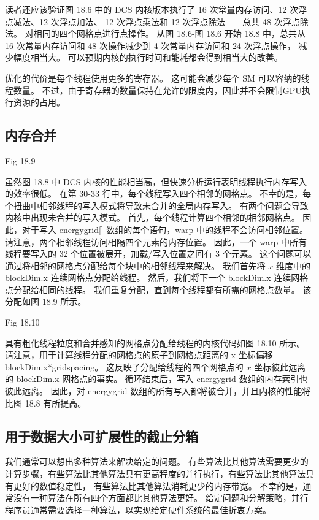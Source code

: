 读者还应该验证图 18.6 中的 DCS 内核版本执行了 16 次常量内存访问、12 次浮点减法、12 次浮点加法、
12 次浮点乘法和 12 次浮点除法——总共 48 次浮点除法。 对相同的四个网格点进行点操作。 
从图 18.6-图 18.6 开始 18.8 中，总共从 16 次常量内存访问和 48 次操作减少到 4 次常量内存访问和 24 次浮点操作，
减少幅度相当大。 可以预期内核的执行时间和能耗都会得到相当大的改善。

优化的代价是每个线程使用更多的寄存器。 这可能会减少每个 SM 可以容纳的线程数量。 
不过，由于寄存器的数量保持在允许的限度内，因此并不会限制GPU执行资源的占用。

\subsection{内存合并}
{\color{red} Fig 18.9}

虽然图 18.8 中 DCS 内核的性能相当高，但快速分析运行表明线程执行内存写入的效率很低。 
在第 30-33 行中，每个线程写入四个相邻的网格点。 不幸的是，每个扭曲中相邻线程的写入模式将导致未合并的全局内存写入。 
有两个问题会导致内核中出现未合并的写入模式。 首先，每个线程计算四个相邻的相邻网格点。 
因此，对于写入 energygrid[] 数组的每个语句，warp 中的线程不会访问相邻位置。 
请注意，两个相邻线程访问相隔四个元素的内存位置。 
因此，一个 warp 中所有线程要写入的 32 个位置被展开，加载/写入位置之间有 3 个元素。 
这个问题可以通过将相邻的网格点分配给每个块中的相邻线程来解决。 
我们首先将 $x$ 维度中的 blockDim.x 连续网格点分配给线程。 
然后，我们将下一个 blockDim.x 连续网格点分配给相同的线程。 
我们重复分配，直到每个线程都有所需的网格点数量。 该分配如图 18.9 所示。

{\color{red} Fig 18.10}

具有粗化线程粒度和合并感知的网格点分配给线程的内核代码如图 18.10 所示。 
请注意，用于计算线程分配的网格点的原子到网格点距离的 $\mathrm{x}$ 坐标偏移 blockDim.x*gridspacing。 
这反映了分配给线程的四个网格点的 $x$ 坐标彼此远离的 blockDim.x 网格点的事实。 
循环结束后，写入 energygrid 数组的内存索引也彼此远离。 
因此，对 energygrid 数组的所有写入都将被合并，并且内核的性能将比图 18.8 有所提高。

\subsection{用于数据大小可扩展性的截止分箱}
我们通常可以想出多种算法来解决给定的问题。 
有些算法比其他算法需要更少的计算步骤，有些算法比其他算法具有更高程度的并行执行，有些算法比其他算法具有更好的数值稳定性，
有些算法比其他算法消耗更少的内存带宽。 不幸的是，通常没有一种算法在所有四个方面都比其他算法更好。 
给定问题和分解策略，并行程序员通常需要选择一种算法，以实现给定硬件系统的最佳折衷方案。

